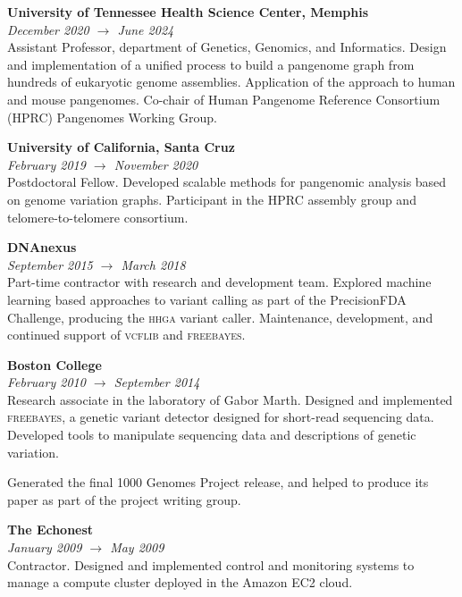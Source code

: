 \documentclass[11pt,hidelinks,letterpaper]{article}
\begin{document}
\hfill \break
\noindent
{\large \bf University of Tennessee Health Science Center, Memphis} \\
\emph{December 2020 $\to$ June 2024} \\
\noindent
Assistant Professor, department of Genetics, Genomics, and Informatics.
Design and implementation of a unified process to build a pangenome graph from hundreds of eukaryotic genome assemblies.
Application of the approach to human and mouse pangenomes.
Co-chair of Human Pangenome Reference Consortium (HPRC) Pangenomes Working Group.

\hfill \break
\noindent
{\large \bf University of California, Santa Cruz} \\
\emph{February 2019 $\to$ November 2020} \\
\noindent
Postdoctoral Fellow. %
Developed scalable methods for pangenomic analysis based on genome variation graphs.
Participant in the HPRC assembly group and telomere-to-telomere consortium.

\hfill \break
\noindent
{\large \bf DNAnexus} \\
\emph{September 2015 $\to$ March 2018} \\
\noindent
Part-time contractor with research and development team. Explored machine learning based approaches to variant calling as part of the PrecisionFDA Challenge, producing the \textsc{hhga} variant caller.
Maintenance, development, and continued support of \textsc{vcflib} and \textsc{freebayes}.

\hfill \break
\noindent
{\large \bf Boston College} \\
\emph{February 2010 $\to$ September 2014} \\
Research associate in the laboratory of Gabor Marth.
Designed and implemented \textsc{freebayes}, a genetic variant detector designed for short-read sequencing data.
Developed tools to manipulate sequencing data and descriptions of genetic variation.

Generated the final 1000 Genomes Project release, and helped to produce its paper as part of the project writing group.


\hfill \break
\noindent
{\large \bf The Echonest} \\
\emph{January 2009 $\to$ May 2009} \\
Contractor. Designed and implemented control and monitoring systems to manage a compute cluster deployed in the Amazon EC2 cloud.
\end{document}
